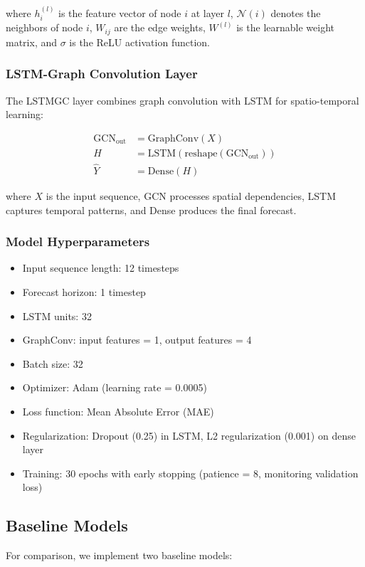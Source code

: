 \documentclass[12pt,a4paper]{article}
\begin{document}
where $h_i^{(l)}$ is the feature vector of node $i$ at layer $l$, $\mathcal{N}(i)$ denotes the neighbors of node $i$, $W_{ij}$ are the edge weights, $W^{(l)}$ is the learnable weight matrix, and $\sigma$ is the ReLU activation function.

\subsubsection{LSTM-Graph Convolution Layer}
The LSTMGC layer combines graph convolution with LSTM for spatio-temporal learning:

\begin{align}
\text{GCN}_{\text{out}} &= \text{GraphConv}(X) \\
H &= \text{LSTM}(\text{reshape}(\text{GCN}_{\text{out}})) \\
\hat{Y} &= \text{Dense}(H)
\end{align}

where $X$ is the input sequence, GCN processes spatial dependencies, LSTM captures temporal patterns, and Dense produces the final forecast.

\subsubsection{Model Hyperparameters}
\begin{itemize}
    \item Input sequence length: 12 timesteps
    \item Forecast horizon: 1 timestep
    \item LSTM units: 32
    \item GraphConv: input features = 1, output features = 4
    \item Batch size: 32
    \item Optimizer: Adam (learning rate = 0.0005)
    \item Loss function: Mean Absolute Error (MAE)
    \item Regularization: Dropout (0.25) in LSTM, L2 regularization (0.001) on dense layer
    \item Training: 30 epochs with early stopping (patience = 8, monitoring validation loss)
\end{itemize}

\subsection{Baseline Models}
For comparison, we implement two baseline models:
\end{document}
